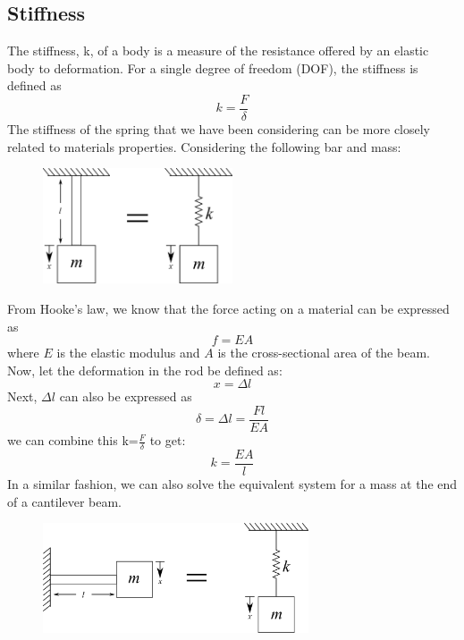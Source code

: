 \documentclass[12pt,a4paper]{article}
\begin{document}
		\subsection*{Stiffness}
			The stiffness, k, of a body is a measure of the resistance offered by an elastic body to deformation. For a single degree of freedom (DOF), the stiffness is defined as
			\begin{equation}
				k=\frac{F}{\delta}
			\end{equation}
			The stiffness of the spring that we have been considering can be more closely related to materials properties. Considering the following bar and mass:
			\begin{figure}[H]
				\centering
				\includegraphics[width=0.5\textwidth]{../../Figures/spring_and_bar_mass_vertical.png}
			\end{figure}		
			From Hooke's law, we know that the force acting on a material can be expressed as 
			\begin{equation}
				f=EA
			\end{equation}
			 where $E$ is the elastic modulus and $A$ is the cross-sectional area of the beam. Now, let the deformation in the rod be defined as:
			\begin{equation}
				x=\Delta l
			\end{equation}			
			Next, $\Delta l$ can also be expressed as 
			\begin{equation}
				\delta = \Delta l = \frac{F l}{EA}
			\end{equation}				
			 we can combine this k=$\frac{F}{\delta}$ to get:
			\begin{equation}
				k = \frac{EA}{l}
			\end{equation}			
			In a similar fashion, we can also solve the equivalent system for a mass at the end of a cantilever beam.
			\begin{figure}[H]
				\centering
				\includegraphics[width=0.7\textwidth]{../../Figures/spring_and_bar_mass_cantilever_beam.png}
			\end{figure}			
\end{document}
